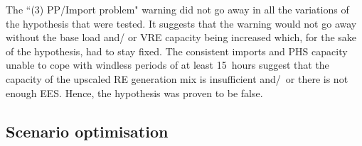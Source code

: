 The ``(3) PP/Import problem" warning did not go away in all the variations of the hypothesis that were tested.
It suggests that the warning would not go away without the base load and/ or VRE capacity being increased which, for the sake of the hypothesis, had to stay fixed.
The consistent imports and PHS capacity unable to cope with windless periods of at least 15~hours suggest that the capacity of the upscaled RE generation mix is insufficient and/~or there is not enough EES.
Hence, the hypothesis was proven to be false.



\subsection{Scenario optimisation}



